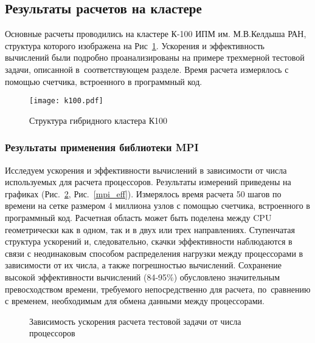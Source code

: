 \subsection{Результаты расчетов на кластере}

Основные расчеты проводились на кластере К-100 ИПМ им. М.В.Келдыша РАН, 
структура которого изображена на Рис~\ref{pic_k100}.
Ускорения и эффективность вычислений
были подробно проанализированы на примере трехмерной тестовой задачи, описанной в~соответствующем
разделе. Время расчета измерялось с помощью счетчика, встроенного в программный код.

\begin{figure}[!h]\center
\texttt{[image: k100.pdf]} 
\caption{Структура гибридного кластера К100}
\label{pic_k100}
\end{figure}

\subsubsection{Результаты применения библиотеки MPI}

Исследуем ускорения и эффективности вычислений в зависимости от числа
используемых для расчета процессоров. Результаты измерений приведены
на графиках (Рис.~\ref{mpi_speedup}, Рис.~\ref{mpi_eff}).
Измерялось время расчета 50 шагов по времени на сетке размером 4 миллиона узлов
с помощью счетчика, встроенного в программный код.
Расчетная область может быть поделена между CPU геометрически как в одном, так и в двух или трех направлениях.
Ступенчатая структура ускорений и, следовательно, скачки эффективности наблюдаются
в связи с неодинаковым способом распределения нагрузки между процессорами
в зависимости от их числа, а также погрешностью вычислений. Сохранение высокой
эффективности вычислений (84-95\%) обусловлено значительным превосходством времени, требуемого
непосредственно для расчета, по~сравнению с временем, необходимым для обмена данными
между процессорами.

\begin{figure}[!h]
\begin{center}
\caption{Зависимость ускорения расчета тестовой задачи от числа процессоров}
\label{mpi_speedup}
\end{center}
\end{figure}

